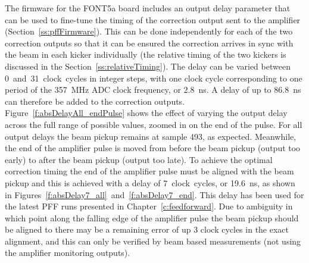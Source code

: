 The firmware for the FONT5a board includes an output delay parameter that can be used to fine-tune the timing of the correction output sent to the amplifier (Section~\ref{ss:pffFirmware}). This can be done independently for each of the two correction outputs so that it can be ensured the correction arrives in sync with the beam in each kicker individually (the relative timing of the two kickers is discussed in the Section~\ref{ss:relativeTiming}). The delay can be varied between 0~and~31~clock~cycles in integer steps, with one clock cycle corresponding to one period of the 357~MHz ADC clock frequency, or 2.8~ns. A delay of up to 86.8~ns can therefore be added to the correction outputs. Figure~\ref{f:absDelayAll_endPulse} shows the effect of varying the output delay across the full range of possible values, zoomed in on the end of the pulse. For all output delays the beam pickup remains at sample 493, as expected. Meanwhile, the end of the amplifier pulse is moved from before the beam pickup (output too early) to after the beam pickup (output too late). To achieve the optimal correction timing the end of the amplifier pulse must be aligned with the beam pickup and this is achieved with a delay of 7~clock~cycles, or 19.6~ns, as shown in Figures~\ref{f:absDelay7_all}~and~\ref{f:absDelay7_end}. This delay has been used for the latest PFF runs presented in Chapter~\ref{c:feedforward}. Due to ambiguity in which point along the falling edge of the amplifier pulse the beam pickup should be aligned to there may be a remaining error of up 3 clock cycles in the exact alignment, and this can only be verified by beam based measurements (not using the amplifier monitoring outputs). 

